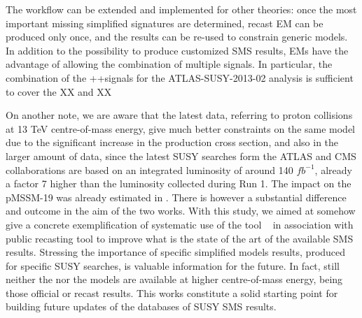 \documentclass[epj,nopacs,fleqn]{svjour}
\begin{document}
The workflow can be extended and implemented for other theories: once the most important missing simplified signatures are determined, recast EM can be produced only once, and the results can be re-used to constrain generic models. In addition to the possibility to produce customized SMS results, EMs have the advantage of allowing the combination of multiple signals. In particular, the combination of the \Ttwo+\Tfive+\TGQ signals for the ATLAS-SUSY-2013-02 analysis is sufficient to cover the XX and XX%

On another note, we are aware that the latest data, referring to proton collisions at 13 TeV centre-of-mass energy, give much better constraints on the same model due to the significant increase in the production cross section, and also in the larger amount of data, since the latest SUSY searches form the ATLAS and CMS collaborations are based on an integrated luminosity of around 140 $fb^{-1}$, already a factor 7 higher than the luminosity collected during Run 1. The impact on the pMSSM-19 was already estimated in \cite{SMODELS13}. There is however a substantial difference and outcome in the aim of the two works. With this study, we aimed at somehow give a concrete exemplification of systematic use of the tool \SMO~ in association with public recasting tool to improve what is the state of the art of the available SMS results. Stressing the importance of specific simplified models results, produced for specific SUSY searches, is valuable information for the future. In fact, still neither the \Tfive nor the \TGQ models are available at higher centre-of-mass energy, being those official or recast results. This works constitute a solid starting point for building future updates of the databases of SUSY SMS results.  
\end{document}
